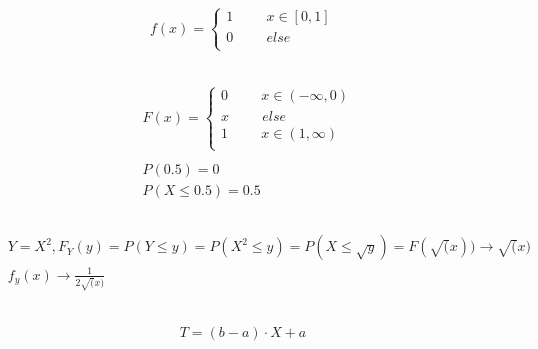 \documentclass[a4paper]{article}
\newcommand{\tab}{\hspace{1cm}}
\begin{document}
\thispagestyle{fancy} %
{}

\section{}
\subsection{}
\begin{align*}
f(x) =
\begin{cases}
1 \tab x \in [0,1] \\
0 \tab else \\
\end{cases}
\end{align*}
\subsection{}
\begin{align*}
& F(x) = \begin{cases}
0 \tab x \in (-\infty, 0) \\
x \tab else \\
1 \tab x \in (1,\infty) \\
\end{cases}
\\ \\
& P(0.5) = 0 \\
& P(X \le 0.5) = 0.5 
\end{align*}
\subsection{}
\begin{align*}
& Y = X^2, F_Y(y) = P(Y \le y) = P(X^2 \le y) = P(X \le \sqrt{y}) = F(\sqrt(x)) \rightarrow \sqrt(x) \\
& f_y(x) \rightarrow \frac{1}{2\sqrt(x)}
\end{align*}

\subsection{}
\begin{align*}
T = (b-a)\cdot X + a
\end{align*}

\section{}
\end{document}
